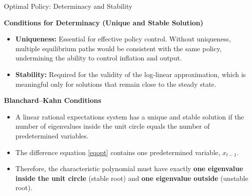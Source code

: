 \documentclass[11pt,aspectratio=169]{beamer}
\begin{document}
\begin{frame}[label=Blanchard]{Optimal Policy: Determinacy and Stability}
\small

\textbf{Conditions for Determinacy (Unique and Stable Solution)}
\begin{itemize}
  \item \textbf{Uniqueness:} Essential for effective policy control. Without uniqueness, multiple equilibrium paths would be consistent with the same policy, undermining the ability to control inflation and output.
  \item \textbf{Stability:} Required for the validity of the log-linear approximation, which is meaningful only for solutions that remain close to the steady state.
\end{itemize}

\vspace{0.2cm}

\textbf{Blanchard--Kahn Conditions}
\begin{itemize}
  \item A linear rational expectations system has a unique and stable solution if the number of eigenvalues inside the unit circle equals the number of predetermined variables.
  \item The difference equation \eqref{eqopt} contains one predetermined variable, $x_{t-1}$.
  \item Therefore, the characteristic polynomial must have exactly \textbf{one eigenvalue inside the unit circle} (stable root) and \textbf{one eigenvalue outside} (unstable root).
\end{itemize}

\vspace{0.3cm}
\begin{center}
\hyperlink{Appendix G}{}
\end{center}

\end{frame}
\end{document}
